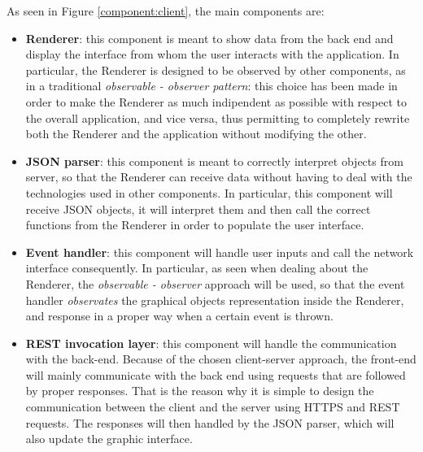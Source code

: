 As seen in Figure \ref{component:client}, the main components are:
\begin{itemize}
    \item \textbf{Renderer}: this component is meant to show data from the back end and display the interface from whom the user interacts with the application.
                                 In particular, the Renderer is designed to be observed by other components, as in a traditional \emph{observable - observer pattern}:
                                 this choice has been made in order to make the Renderer as much indipendent as possible with respect to the overall application, and
                                 vice versa, thus permitting to completely rewrite both the Renderer and the application without modifying the other. 
                    
    \item \textbf{JSON parser}: this component is meant to correctly interpret objects from server, so that the Renderer can receive data without having to deal
                                    with the technologies used in other components. In particular, this component will receive JSON objects, it will interpret them and
                                    then call the correct functions from the Renderer in order to populate the user interface.
                                    
    \item \textbf{Event handler}: this component will handle user inputs and call the network interface consequently. In particular, as seen when dealing about the 
                                      Renderer, the \emph{observable - observer} approach will be used, so that the event handler \emph{observates} the graphical objects
                                      representation inside the Renderer, and response in a proper way when a certain event is thrown.
                        
    \item \textbf{REST invocation layer}: this component will handle the communication with the back-end. Because of the chosen client-server approach, the front-end
                                              will mainly communicate with the back end using requests that are followed by proper responses. That is the reason why it is 
                                              simple to design the communication between the client and the server using HTTPS and REST requests. The responses will then 
                                              handled by the JSON parser, which will also update the graphic interface.
\end{itemize}
